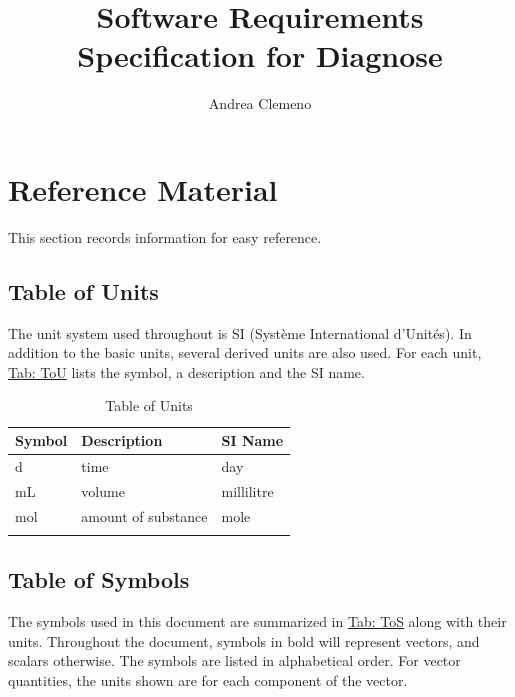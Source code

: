\documentclass[12pt]{article}
\title{Software Requirements Specification for Diagnose}
\author{Andrea Clemeno}
\begin{document}
\maketitle
\tableofcontents
\newpage
\section{Reference Material}
\label{Sec:RefMat}
This section records information for easy reference.

\subsection{Table of Units}
\label{Sec:ToU}
The unit system used throughout is SI (Système International d'Unités). In addition to the basic units, several derived units are also used. For each unit, \hyperref[Table:ToU]{Tab: ToU} lists the symbol, a description and the SI name.

\begin{longtable}{l l l}
\toprule
\textbf{Symbol} & \textbf{Description} & \textbf{SI Name}
\\
\midrule
\endhead
${\text{d}}$ & time & day
\\
${\text{mL}}$ & volume & millilitre
\\
${\text{mol}}$ & amount of substance & mole
\\
\bottomrule
\caption{Table of Units}
\label{Table:ToU}
\end{longtable}
\subsection{Table of Symbols}
\label{Sec:ToS}
The symbols used in this document are summarized in \hyperref[Table:ToS]{Tab: ToS} along with their units. Throughout the document, symbols in bold will represent vectors, and scalars otherwise. The symbols are listed in alphabetical order. For vector quantities, the units shown are for each component of the vector.
\end{document}
